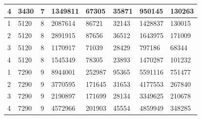 \documentclass[nocopyrightspace]{acm_proc_article-sp}
\begin{document}
\begin{table}
\begin{tabular}{|l|l|l|l|l|l|l|l|}
4        & 3430 & 7 & 1349811                                                  & 67305        & 35871          & 950145           & 130263             \\ \hline
1        & 5120 & 8 & 2087614                                                  & 86721        & 32143          & 1428837          & 130015             \\ \hline
2        & 5120 & 8 & 2891915                                                  & 87656        & 36512          & 1643975          & 171009             \\ \hline
3        & 5120 & 8 & 1170917                                                  & 71039        & 28429          & 797186           & 68344              \\ \hline
4        & 5120 & 8 & 1545349                                                  & 78305        & 23893          & 1470287          & 101232             \\ \hline
1        & 7290 & 9 & 8944001                                                  & 252987       & 95365          & 5591116          & 751477             \\ \hline
2        & 7290 & 9 & 3770595                                                  & 171645       & 31653          & 4177553          & 267840             \\ \hline
3        & 7290 & 9 & 2190897                                                  & 171699       & 28134          & 3349625          & 210678             \\ \hline
4        & 7290 & 9 & 4572966                                                  & 201903       & 45554          & 4859949          & 348285             \\ \hline
\end{tabular}
\end{table}
\end{document}
